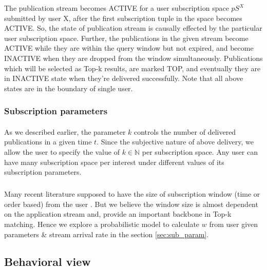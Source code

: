 \documentclass[a4paper,12pt,oneside]{book}
\theoremstyle{definition}
\theoremstyle{remark}
\begin{document}
The publication stream becomes ACTIVE for a user subscription space $pS^X$ submitted by user X, after the first subscription tuple in the space becomes ACTIVE. So, the state of publication stream is causally effected by the particular user subscription space. Further, the publications in the given stream become ACTIVE while they are within the query window but not expired, and become INACTIVE when they are dropped from the window simultaneously. Publications which will be selected as Top-k results, are marked TOP, and eventually they are in INACTIVE state when they're delivered successfully. Note that all above states are in the boundary of single user.

\subsubsection{Subscription parameters}
\paragraph*{}
As we described earlier, the parameter $k$ controls the number of delivered publications in a given time $t$. Since the subjective nature of above delivery, we allow the user to specify the value of $k \in \mathbb{N}$ per subscription space. Any user can have many subscription space per interest under different values of its subscription parameters.
\subparagraph*{}
Many recent literature supposed to have the size of subscription window (time or order based) from the user \cite{Pripuzic2012,Drosou2009}. But we believe the window size is almost dependent on the application stream and, provide an important backbone in Top-k matching. Hence we explore a probabilistic model to calculate $w$ from user given parameters \& stream arrival rate in the section \ref{sec:sub_param}.

\subsection{Behavioral view}
\end{document}
